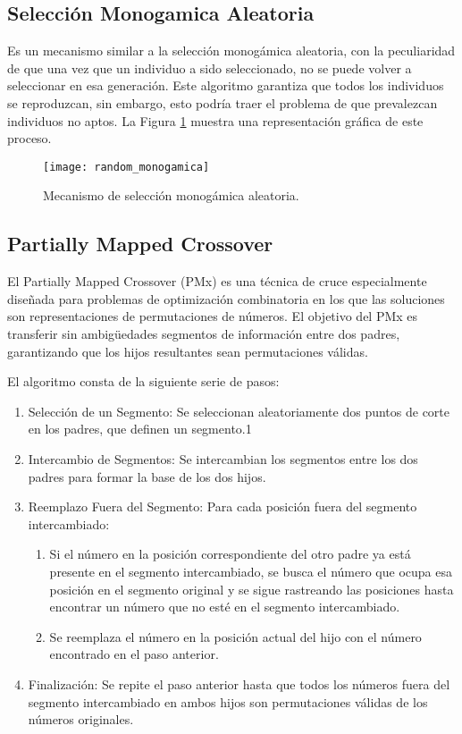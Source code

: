 \subsection{Selección Monogamica Aleatoria}
Es un mecanismo similar a la selección monogámica aleatoria, con la peculiaridad de que una vez que un individuo a sido seleccionado, no se puede volver a seleccionar en esa generación. Este algoritmo garantiza que todos los individuos se reproduzcan, sin embargo, esto podría traer el problema de que prevalezcan individuos no aptos. La Figura \ref{fig: selection_mono} muestra una representación gráfica de este proceso.

\begin{figure}[htbp]
	\centering
	\texttt{[image: random\_monogamica]}
	\caption{Mecanismo de selección monogámica aleatoria.}
	\label{fig: selection_mono}
\end{figure}


\subsection{Partially Mapped Crossover}
El Partially Mapped Crossover (PMx) es una técnica de cruce especialmente diseñada para problemas de optimización combinatoria en los que las soluciones son representaciones de permutaciones de números. El objetivo del PMx es transferir sin ambigüedades segmentos de información entre dos padres, garantizando que los hijos resultantes sean permutaciones válidas.

El algoritmo consta de la siguiente serie de pasos:

\begin{enumerate}
	\item Selección de un Segmento: Se seleccionan aleatoriamente dos puntos de corte en los padres, que definen un segmento.1
	\item Intercambio de Segmentos: Se intercambian los segmentos entre los dos padres para formar la base de los dos hijos.
	\item Reemplazo Fuera del Segmento: Para cada posición fuera del segmento intercambiado:
	\begin{enumerate}
		\item Si el número en la posición correspondiente del otro padre ya está presente en el segmento intercambiado, se busca el número que ocupa esa posición en el segmento original y se sigue rastreando las posiciones hasta encontrar un número que no esté en el segmento intercambiado.
		\item Se reemplaza el número en la posición actual del hijo con el número encontrado en el paso anterior.
	\end{enumerate}
	\item Finalización: Se repite el paso anterior hasta que todos los números fuera del segmento intercambiado en ambos hijos son permutaciones válidas de los números originales.
\end{enumerate}

